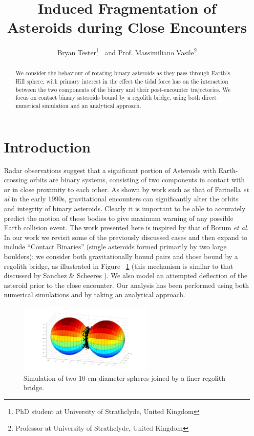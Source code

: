 \documentclass[letterpaper, preprint, paper,11pt]{AAS}	%
\begin{document}
\title{\textsf{\textbf{Induced Fragmentation of Asteroids during Close Encounters}}}
\author{\textsf{Bryan Tester}\thanks{PhD student at University of Strathclyde, United Kingdom}
\ and \textsf{Prof. Massimiliano Vasile}\thanks{Professor at University of Strathclyde, United Kingdom}}

\maketitle{} 		


\begin{abstract}
We consider the behaviour of rotating binary asteroids as they pass through Earth's Hill sphere, with primary interest in the effect the tidal force has on the interaction between the two components of the binary and their post-encounter trajectories. We focus on contact binary asteroids bound by a regolith bridge, using both direct numerical simulation and an analytical approach.
\end{abstract}

\section{Introduction}
Radar observations suggest that a significant portion of Asteroids with Earth-crossing orbits are binary systems, consisting of two components in contact with or in close proximity to each other. As shown by work such as that of Farinella \textit{et al} \cite{binaryevo} in the early 1990s, gravitational encounters can significantly alter the orbits and integrity of binary asteroids. Clearly it is important to be able to accurately predict the motion of these bodies to give maximum warning of any possible Earth collision event. The work presented here is inspired by that of Borum \textit{et al}\cite{exchange}. In our work we revisit some of the previously discussed cases and then expand to include “Contact Binaries” (single asteroids formed primarily by two large boulders); we consider both gravitationally bound pairs and those bound by a regolith bridge, as illustrated in Figure ~\ref{fig:Pic} (this mechanism is similar to that discussed by Sanchez \& Scheeres \cite{dustbound}). We also model an attempted deflection of the asteroid prior to the close encounter. Our analysis has been performed using both numerical simulations and by taking an analytical approach.
\begin{figure}[H]
\centering
\includegraphics[width=0.6\textwidth]{binary_3d.png} 
\caption{Simulation of two 10 cm diameter spheres joined by a finer regolith bridge.} 
\label{fig:Pic}
\end{figure} 
\end{document}
